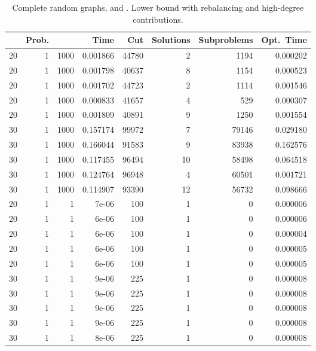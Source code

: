 \documentclass[a4paper,11pt]{article}
\begin{document}
\begin{table}
\begin{center}
\begin{tabular}{|rrr|r|r|rr|r|}
\hline
 & Prob. &  & Time & Cut & Solutions & Subproblems & Opt.\ Time \\
\hline
20 & 1 & 1000 & 0.001866 & 44780 & 2 & 1194 & 0.000202 \\
20 & 1 & 1000 & 0.001798 & 40637 & 8 & 1154 & 0.000523 \\
20 & 1 & 1000 & 0.001702 & 44723 & 2 & 1114 & 0.001546 \\
20 & 1 & 1000 & 0.000833 & 41657 & 4 & 529 & 0.000307 \\
20 & 1 & 1000 & 0.001809 & 40891 & 9 & 1250 & 0.001554 \\
30 & 1 & 1000 & 0.157174 & 99972 & 7 & 79146 & 0.029180 \\
30 & 1 & 1000 & 0.166044 & 91583 & 9 & 83938 & 0.162576 \\
30 & 1 & 1000 & 0.117455 & 96494 & 10 & 58498 & 0.064518 \\
30 & 1 & 1000 & 0.124764 & 96948 & 4 & 60501 & 0.001721 \\
30 & 1 & 1000 & 0.114907 & 93390 & 12 & 56732 & 0.098666 \\
\hline
20 & 1 & 1 & 7e-06 & 100 & 1 & 0 & 0.000006 \\
20 & 1 & 1 & 6e-06 & 100 & 1 & 0 & 0.000006 \\
20 & 1 & 1 & 6e-06 & 100 & 1 & 0 & 0.000004 \\
20 & 1 & 1 & 6e-06 & 100 & 1 & 0 & 0.000005 \\
20 & 1 & 1 & 6e-06 & 100 & 1 & 0 & 0.000005 \\
30 & 1 & 1 & 9e-06 & 225 & 1 & 0 & 0.000008 \\
30 & 1 & 1 & 9e-06 & 225 & 1 & 0 & 0.000008 \\
30 & 1 & 1 & 9e-06 & 225 & 1 & 0 & 0.000008 \\
30 & 1 & 1 & 9e-06 & 225 & 1 & 0 & 0.000008 \\
30 & 1 & 1 & 8e-06 & 225 & 1 & 0 & 0.000008 \\
\hline
\end{tabular}
\end{center}
\caption{Complete random graphs,  and . Lower
  bound with rebalancing and high-degree contributions.}
\label{tab:complete-highdegree}
\end{table}
\end{document}
